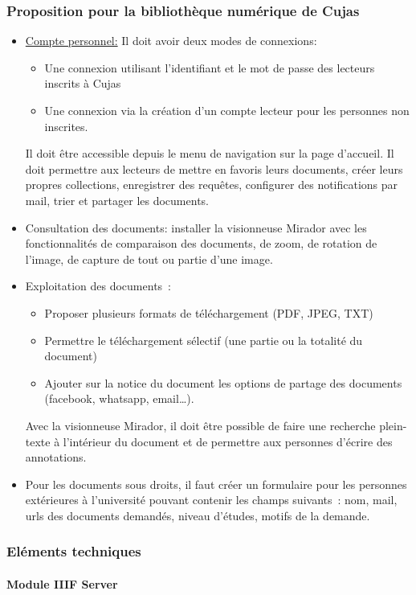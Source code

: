 \subsubsection{Proposition pour la bibliothèque numérique de Cujas}
\begin{itemize}
	\item \uline{Compte personnel:}
Il doit avoir deux modes de connexions: 
\begin{itemize}
	\item Une connexion utilisant l’identifiant et le mot de passe des lecteurs inscrits à Cujas
\item Une connexion via la création d’un compte lecteur pour les personnes non inscrites.
\end{itemize} 
Il doit être accessible depuis le menu de navigation sur la page d’accueil.
Il doit permettre aux lecteurs de mettre en favoris leurs documents, créer leurs propres collections, enregistrer des requêtes, configurer des notifications par mail, trier et partager les documents.
\item Consultation des documents: installer la visionneuse Mirador avec les fonctionnalités de comparaison des documents, de zoom, de rotation de l’image, de capture de  tout ou partie d’une image. 
\item Exploitation des documents : 
\begin{itemize}
	\item Proposer plusieurs formats de téléchargement (PDF, JPEG, TXT)
\item Permettre le téléchargement sélectif (une partie ou la totalité du document)
\item Ajouter sur la notice du document les options de partage des documents (facebook, whatsapp, email…).
\end{itemize}
Avec la visionneuse Mirador, il doit être possible de faire une recherche plein-texte à l’intérieur du document et de permettre aux personnes d’écrire des annotations.
\item Pour les documents sous droits, il faut créer un formulaire pour les personnes extérieures à l’université pouvant contenir les champs suivants : nom, mail, urls des documents demandés, niveau d’études, motifs de la demande.
\end{itemize}

\subsubsection{Eléments techniques}
\paragraph*{Module IIIF Server} 


